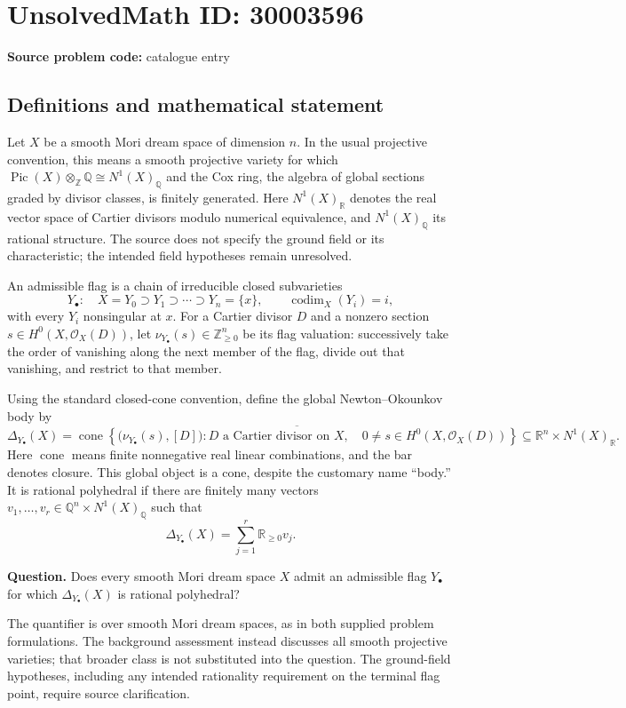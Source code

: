 \documentclass[11pt]{article}
\newcommand{\Z}{\mathbb{Z}}
\newcommand{\Q}{\mathbb{Q}}
\newcommand{\R}{\mathbb{R}}
\begin{document}
\section*{UnsolvedMath ID: 30003596}
\textbf{Source problem code:} catalogue entry
\subsection{Definitions and mathematical statement}
Let \(X\) be a smooth Mori dream space of dimension \(n\). In the usual projective convention, this means a smooth projective variety for which \(\operatorname{Pic}(X)\otimes_{\Z}\Q\cong N^1(X)_{\Q}\) and the Cox ring, the algebra of global sections graded by divisor classes, is finitely generated. Here \(N^1(X)_{\R}\) denotes the real vector space of Cartier divisors modulo numerical equivalence, and \(N^1(X)_{\Q}\) its rational structure. The source does not specify the ground field or its characteristic; the intended field hypotheses remain unresolved.

An admissible flag is a chain of irreducible closed subvarieties
\[
Y_\bullet:\quad X=Y_0\supset Y_1\supset\cdots\supset Y_n=\{x\},
\qquad \operatorname{codim}_X(Y_i)=i,
\]
with every \(Y_i\) nonsingular at \(x\). For a Cartier divisor \(D\) and a nonzero section \(s\in H^0(X,\mathcal O_X(D))\), let \(\nu_{Y_\bullet}(s)\in\Z_{\geq 0}^{n}\) be its flag valuation: successively take the order of vanishing along the next member of the flag, divide out that vanishing, and restrict to that member.

Using the standard closed-cone convention, define the global Newton--Okounkov body by
\[
\Delta_{Y_\bullet}(X)
=
\overline{\operatorname{cone}\!\left\{
\bigl(\nu_{Y_\bullet}(s),[D]\bigr):
D\text{ a Cartier divisor on }X,\quad
0\ne s\in H^0(X,\mathcal O_X(D))
\right\}}
\subseteq \R^n\times N^1(X)_{\R}.
\]
Here \(\operatorname{cone}\) means finite nonnegative real linear combinations, and the bar denotes closure. This global object is a cone, despite the customary name ``body.'' It is rational polyhedral if there are finitely many vectors \(v_1,\ldots,v_r\in\Q^n\times N^1(X)_{\Q}\) such that
\[
\Delta_{Y_\bullet}(X)=\sum_{j=1}^{r}\R_{\geq0}v_j.
\]

\textbf{Question.} Does every smooth Mori dream space \(X\) admit an admissible flag \(Y_\bullet\) for which \(\Delta_{Y_\bullet}(X)\) is rational polyhedral?

The quantifier is over smooth Mori dream spaces, as in both supplied problem formulations. The background assessment instead discusses all smooth projective varieties; that broader class is not substituted into the question. The ground-field hypotheses, including any intended rationality requirement on the terminal flag point, require source clarification.
\end{document}
